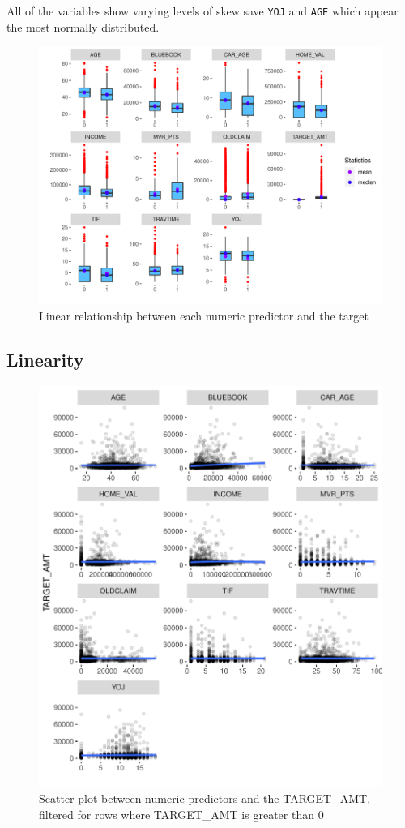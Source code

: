 \documentclass[]{article}
\begin{document}
All of the variables show varying levels of skew save \texttt{YOJ} and
\texttt{AGE} which appear the most normally distributed.

\begin{figure}
\centering
\includegraphics{proj4_files/figure-latex/f4-1.pdf}
\caption{\label{fig:f4}Linear relationship between each numeric predictor
and the target}
\end{figure}

\subsection{Linearity}\label{linearity}

\begin{figure}
\centering
\includegraphics{proj4_files/figure-latex/f5-1.pdf}
\caption{\label{fig:f5}Scatter plot between numeric predictors and the
TARGET\_AMT, filtered for rows where TARGET\_AMT is greater than 0}
\end{figure}
\end{document}
